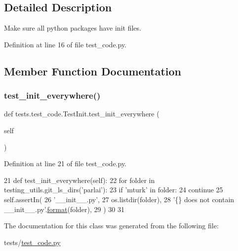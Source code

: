 \subsection{Detailed Description}
\begin{DoxyVerb}Make sure all python packages have init files.
\end{DoxyVerb}
 

Definition at line 16 of file test\+\_\+code.\+py.



\subsection{Member Function Documentation}
\mbox{\label{classtests_1_1test__code_1_1TestInit_a8b97f4f48a8f21267c07578969c5612f}} 
\subsubsection{\texorpdfstring{test\+\_\+init\+\_\+everywhere()}{test\_init\_everywhere()}}
{\footnotesize\ttfamily def tests.\+test\+\_\+code.\+Test\+Init.\+test\+\_\+init\+\_\+everywhere (\begin{DoxyParamCaption}\item[{}]{self }\end{DoxyParamCaption})}



Definition at line 21 of file test\+\_\+code.\+py.


\begin{DoxyCode}
21     \textcolor{keyword}{def }test\_init\_everywhere(self):
22         \textcolor{keywordflow}{for} folder \textcolor{keywordflow}{in} testing\_utils.git\_ls\_dirs(\textcolor{stringliteral}{'parlai'}):
23             \textcolor{keywordflow}{if} \textcolor{stringliteral}{'mturk'} \textcolor{keywordflow}{in} folder:
24                 \textcolor{keywordflow}{continue}
25             self.assertIn(
26                 \textcolor{stringliteral}{'\_\_init\_\_.py'},
27                 os.listdir(folder),
28                 \textcolor{stringliteral}{'\{\} does not contain \_\_init\_\_.py'}.\hyperlink{namespaceparlai_1_1chat__service_1_1services_1_1messenger_1_1shared__utils_a32e2e2022b824fbaf80c747160b52a76}{format}(folder),
29             )
30 
31 
\end{DoxyCode}


The documentation for this class was generated from the following file\+:\begin{DoxyCompactItemize}
\item 
tests/\hyperlink{test__code_8py}{test\+\_\+code.\+py}\end{DoxyCompactItemize}
